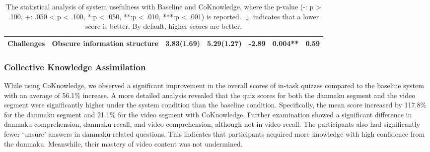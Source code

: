 \begin{table*}[]
\begin{tabular}{ccccccc}
\multirow{-5}{*}{Challenges}                                                 & Obscure information structure       & 3.83(1.69)                             & 5.29(1.27)                               & -2.89   & 0.004** & 0.59   \\ \hline
\end{tabular}
\caption{The statistical analysis of system usefulness with Baseline and CoKnowledge, where the p-value (-: p > .100, +: .050 < p < .100, *:p < .050, **:p < .010, ***:p < .001) is reported. $\downarrow$  indicates that a lower score is better. By default, higher scores are better.}
\label{Usefulness}
\end{table*}

\subsubsection{Collective Knowledge Assimilation} 
While using CoKnowledge, we observed a significant improvement in the overall scores of in-task quizzes compared to the baseline system with an average of 56.1\% increase. %
A more detailed analysis revealed 
that the quiz scores for both the danmaku segment and the video segment were significantly higher under the system condition than the baseline condition. Specifically, the mean score increased by 117.8\% for the danmaku segment and 21.1\% for the video segment with CoKnowledge. 
Further examination showed a significant difference in danmaku comprehension, danmaku recall, and video comprehension, although not in video recall. The participants also had significantly fewer `unsure' answers in danmaku-related questions. This indicates that participants acquired more knowledge with high confidence from the danmaku. Meanwhile, their mastery of video content was not undermined. 

